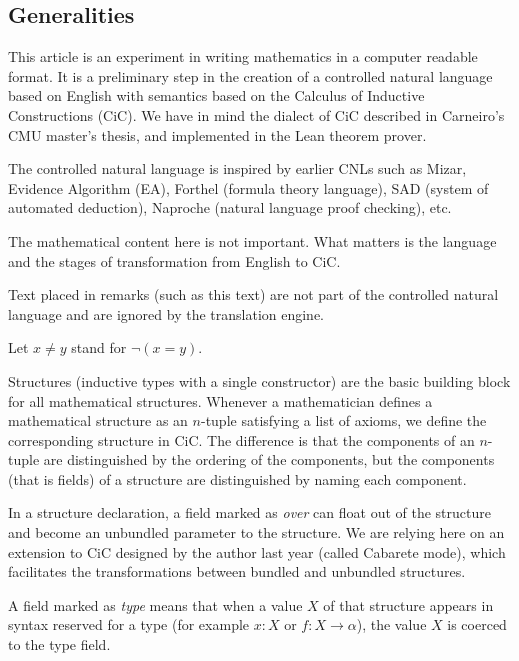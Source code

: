 \documentclass[12pt]{article}
\begin{document}
\begin{cnl}
\section{Generalities}

\begin{remark}
This article is an experiment in writing mathematics in a computer
readable format.  It is a preliminary step in the creation of a
controlled natural language based on English with semantics based on
the Calculus of Inductive Constructions (CiC).  We have in mind the
dialect of CiC described in Carneiro's CMU master's thesis, and
implemented in the Lean theorem prover.

The controlled natural language is inspired by earlier CNLs such as
Mizar, Evidence Algorithm (EA), Forthel (formula theory language), SAD
(system of automated deduction), Naproche (natural language proof
checking), etc.

The mathematical content here is not important.  What matters is the
language and the stages of transformation from English to CiC.

Text placed in remarks (such as this text) are not part of the
controlled natural language and are ignored by the translation engine.
\end{remark}


Let $x \ne y$ stand for $\neg(x = y)$.

\begin{remark}
Structures (inductive types with a single constructor) are the basic
building block for all mathematical structures. Whenever a
mathematician defines a mathematical structure as an $n$-tuple
satisfying a list of axioms, we define the corresponding
structure in CiC. The difference is that the components of an
$n$-tuple are distinguished by the ordering of the components, but the
components (that is fields) of a structure are distinguished by naming
each component.

In a structure declaration, a field marked as {\it over} can float out
of the structure and become an unbundled parameter to the structure.
We are relying here on an extension to CiC designed by the author last
year (called Cabarete mode), which facilitates the transformations
between bundled and unbundled structures.

A field marked as {\it type} means that when a value $X$ of that
structure appears in syntax reserved for a type (for example $x : X$
or $f:X \to \alpha$), the value $X$ is coerced to the type field.


\end{remark}
\end{cnl}
\end{document}
